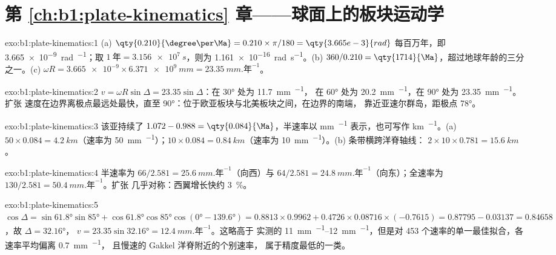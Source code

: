 \section*{第 \ref{ch:b1:plate-kinematics} 章——球面上的板块运动学}

\begin{solution}{exo:b1:plate-kinematics:1}
(a) $\qty{0.210}{\degree\per\Ma} = 0.210\times\pi/180 = \qty{3.665e-3}{rad}$
每百万年，即 \qty{3.665e-9}{rad.^{-1}}；取
$\qty{1}{\text{年}} = \qty{3.156e7}{s}$，则为 \qty{1.161e-16}{rad.s^{-1}}。(b) $360/0.210 =
\qty{1714}{\Ma}$，超过地球年龄的三分之一。(c) $\omega R =
\num{3.665e-9}\times\qty{6.371e9}{mm} = \qty{23.35}{mm.\text{年}^{-1}}$。
\end{solution}

\begin{solution}{exo:b1:plate-kinematics:2}
$v = \omega R\sin\Delta = 23.35\sin\Delta$：在 \ang{30} 处为 \qty{11.7}{mm.^{-1}}，
在 \ang{60} 处为 \qty{20.2}{mm.^{-1}}，在 \ang{90} 处为 \qty{23.35}{mm.^{-1}}。扩张
速度在边界离极点最远处最快，直至
\ang{90}：位于欧亚板块与北美板块之间，在边界的南端，
靠近亚速尔群岛，距极点 \ang{78}。
\end{solution}

\begin{solution}{exo:b1:plate-kinematics:3}
该亚持续了 $1.072 - 0.988 = \qty{0.084}{\Ma}$，半速率以
\unit{mm.^{-1}} 表示，也可写作 \unit{km\per\Ma}。(a) $50\times0.084 =
\qty{4.2}{km}$（速率为 \qty{50}{mm.^{-1}}）；$10\times0.084 = \qty{0.84}{km}$（速率为
\qty{10}{mm.^{-1}}）。(b) 条带横跨洋脊轴线：
$2\times10\times0.781 = \qty{15.6}{km}$。
\end{solution}

\begin{solution}{exo:b1:plate-kinematics:4}
半速率为 $66/2.581 = \qty{25.6}{mm.\text{年}^{-1}}$（向西）与
$64/2.581 = \qty{24.8}{mm.\text{年}^{-1}}$（向东）；全速率为
$130/2.581 = \qty{50.4}{mm.\text{年}^{-1}}$。扩张
几乎对称：西翼增长快约
\qty{3}{\percent}。
\end{solution}

\begin{solution}{exo:b1:plate-kinematics:5}
$\cos\Delta = \sin\ang{61.8}\sin\ang{85} + \cos\ang{61.8}\cos\ang{85}
\cos(\ang{0} - \ang{139.6}) = 0.8813\times0.9962 + 0.4726\times0.08716\times
(-0.7615) = 0.87795 - 0.03137 = 0.84658$，故 $\Delta = \ang{32.16}$，
$v = 23.35\sin\ang{32.16} = \qty{12.4}{mm.\text{年}^{-1}}$。这略高于
实测的 \qtyrange{11}{12}{mm.^{-1}}，但是对
453 个速率的单一最佳拟合，各速率平均偏离 \qty{0.7}{mm.^{-1}}，
且慢速的 Gakkel 洋脊附近的个别速率，
属于精度最低的一类。
\end{solution}

